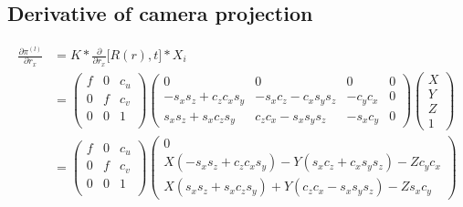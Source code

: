\documentclass[10pt]{article}         %
\begin{document}
\subsection{Derivative of camera projection}
\begin{align*}
\frac{\partial \pi^{(l)}}{\partial r_x} &= K*\frac{\partial }{\partial r_x}\Big[R(r),t\Big]*X_i\\
&= \begin{pmatrix} f& 0& c_u\\ 0& f& c_v\\0& 0& 1\\ \end{pmatrix}\begin{pmatrix}
0& 0& 0& 0\\
-s_xs_z+c_zc_xs_y& -s_xc_z-c_xs_ys_z& -c_yc_x&0\\
s_xs_z+s_xc_zs_y& c_zc_x-s_xs_ys_z& -s_xc_y&0
\end{pmatrix}\begin{pmatrix}X\\Y\\Z\\1\end{pmatrix}\\
&=\begin{pmatrix} f& 0& c_u\\ 0& f& c_v\\0& 0& 1\\ \end{pmatrix}\begin{pmatrix}
0\\
X(-s_xs_z+c_zc_xs_y)-Y(s_xc_z+c_xs_ys_z)-Zc_yc_x\\
X(s_xs_z+s_xc_zs_y)+Y(c_zc_x-s_xs_ys_z)-Zs_xc_y
\end{pmatrix}\\
\end{align*}



\end{document}
